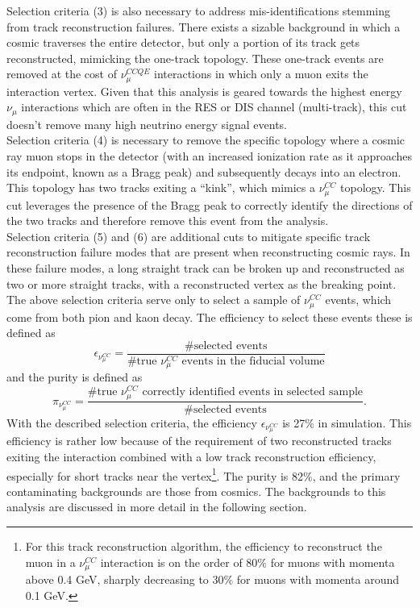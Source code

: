 Selection criteria (3) is also necessary to address mis-identifications stemming from track reconstruction failures. There exists a sizable background in which a cosmic traverses the entire detector, but only a portion of its track gets reconstructed, mimicking the one-track topology. These one-track events are removed at the cost of $\nu_\mu^{CCQE}$ interactions in which only a muon exits the interaction vertex. Given that this analysis is geared towards the highest energy $\nu_\mu$ interactions which are often in the RES or DIS channel (multi-track), this cut doesn't remove many high neutrino energy signal events.\\

Selection criteria (4) is necessary to remove the specific topology where a cosmic ray muon stops in the detector (with an increased ionization rate as it approaches its endpoint, known as a Bragg peak) and subsequently decays into an electron. This topology has two tracks exiting a ``kink'', which mimics a $\nu_\mu^{CC}$ topology. This cut leverages the presence of the Bragg peak to correctly identify the directions of the two tracks and therefore remove this event from the analysis.\\

Selection criteria (5) and (6) are additional cuts to mitigate specific track reconstruction failure modes that are present when reconstructing cosmic rays. In these failure modes, a long straight track can be broken up and reconstructed as two or more straight tracks, with a reconstructed vertex as the breaking point.\\

The above selection criteria serve only to select a sample of $\nu_\mu^{CC}$ events, which come from both pion and kaon decay. The efficiency to select these events these is defined as
\begin{equation}
\epsilon_{\nu_\mu^{CC}} = \frac{\text{\# selected events}}{\text{\# true $\nu_\mu^{CC}$ events in the fiducial volume}}
\end{equation}
and the purity is defined as
\begin{equation}
\pi_{\nu_\mu^{CC}} = \frac{\text{\# true $\nu_\mu^{CC}$ correctly identified events in selected sample}}{\text{\# selected events}}.
\end{equation}
With the described selection criteria, the efficiency $\epsilon_{\nu_\mu^{CC}}$ is 27\% in simulation. This efficiency is rather low because of the requirement of two reconstructed tracks exiting the interaction combined with a low track reconstruction efficiency, especially for short tracks near the vertex\footnote{For this track reconstruction algorithm, the efficiency to reconstruct the muon in a $\nu_\mu^{CC}$ interaction is on the order of 80\% for muons with momenta above 0.4 GeV, sharply decreasing to 30\% for muons with momenta around 0.1 GeV.}. The purity is 82\%, and the primary contaminating backgrounds are those from cosmics. The backgrounds to this analysis are discussed in more detail in the following section.

